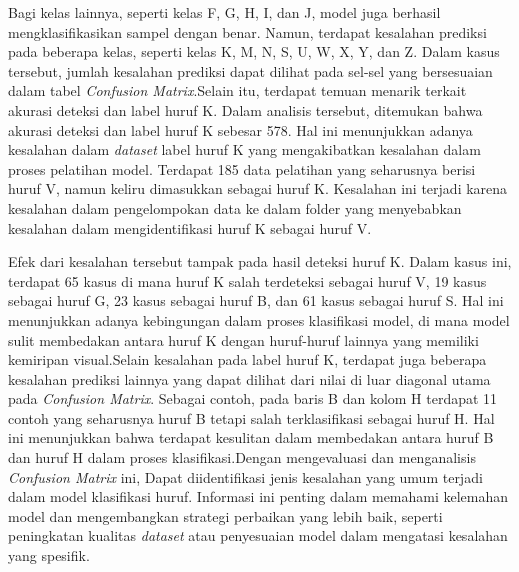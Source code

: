 Bagi kelas lainnya, seperti kelas F, G, H, I, dan J, model juga berhasil mengklasifikasikan sampel dengan benar. Namun, terdapat kesalahan prediksi pada beberapa kelas, seperti kelas K, M, N, S, U, W, X, Y, dan Z. Dalam kasus tersebut, jumlah kesalahan prediksi dapat dilihat pada sel-sel yang bersesuaian dalam tabel \textit{Confusion Matrix}.Selain itu, terdapat temuan menarik terkait akurasi deteksi dan label huruf K. Dalam analisis tersebut, ditemukan bahwa akurasi deteksi dan label huruf K sebesar 578. Hal ini menunjukkan adanya kesalahan dalam \textit{dataset} label huruf K yang mengakibatkan kesalahan dalam proses pelatihan model. Terdapat 185 data pelatihan yang seharusnya berisi huruf V, namun keliru dimasukkan sebagai huruf K. Kesalahan ini terjadi karena kesalahan dalam pengelompokan data ke dalam folder yang menyebabkan kesalahan dalam mengidentifikasi huruf K sebagai huruf V.

Efek dari kesalahan tersebut tampak pada hasil deteksi huruf K. Dalam kasus ini, terdapat 65 kasus di mana huruf K salah terdeteksi sebagai huruf V, 19 kasus sebagai huruf G, 23 kasus sebagai huruf B, dan 61 kasus sebagai huruf S. Hal ini menunjukkan adanya kebingungan dalam proses klasifikasi model, di mana model sulit membedakan antara huruf K dengan huruf-huruf lainnya yang memiliki kemiripan visual.Selain kesalahan pada label huruf K, terdapat juga beberapa kesalahan prediksi lainnya yang dapat dilihat dari nilai di luar diagonal utama pada \textit{Confusion Matrix}. Sebagai contoh, pada baris B dan kolom H terdapat 11 contoh yang seharusnya huruf B tetapi salah terklasifikasi sebagai huruf H. Hal ini menunjukkan bahwa terdapat kesulitan dalam membedakan antara huruf B dan huruf H dalam proses klasifikasi.Dengan mengevaluasi dan menganalisis \textit{Confusion Matrix} ini, Dapat diidentifikasi jenis kesalahan yang umum terjadi dalam model klasifikasi huruf. Informasi ini penting dalam memahami kelemahan model dan mengembangkan strategi perbaikan yang lebih baik, seperti peningkatan kualitas \textit{dataset} atau penyesuaian model dalam mengatasi kesalahan yang spesifik.


